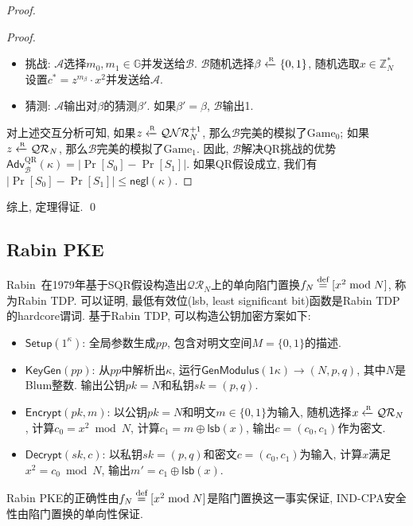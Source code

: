 \begin{proof}
\begin{proof}
\begin{itemize}
	\item 挑战: $\mathcal{A}$选择$m_0, m_1 \in \mathbb{G}$并发送给$\mathcal{B}$.  
		$\mathcal{B}$随机选择$\beta \xleftarrow{\textup{\tiny R}} \{0,1\}$, 随机选取$x \in \mathbb{Z}_N^*$
		设置$c^* = z^{m_\beta} \cdot x^2$并发送给$\mathcal{A}$.   

	\item 猜测: $\mathcal{A}$输出对$\beta$的猜测$\beta'$. 如果$\beta' = \beta$, $\mathcal{B}$输出1. 
\end{itemize} 
对上述交互分析可知, 如果$z \xleftarrow{\textup{\tiny R}} \mathcal{QNR}_N^{+1}$, 那么$\mathcal{B}$完美的模拟了$\text{Game}_0$; 
如果$z \xleftarrow{\textup{\tiny R}} \mathcal{QR}_N$, 那么$\mathcal{B}$完美的模拟了$\text{Game}_1$. 
因此, $\mathcal{B}$解决QR挑战的优势$\mathsf{Adv}_\mathcal{B}^\text{QR}(\kappa) = |\Pr[S_0]-\Pr[S_1]|$. 
如果QR假设成立, 我们有$|\Pr[S_0]-\Pr[S_1]| \leq \mathsf{negl}(\kappa)$. 
\end{proof}
综上, 定理得证. \qed
\end{proof}

\subsection{Rabin PKE}
Rabin~\cite{Rabin-TechReport-1979}在1979年基于SQR假设构造出$\mathcal{QR}_N$上的单向陷门置换$f_N \stackrel{\textup{def}}{=} [x^2 \bmod N]$, 
称为Rabin TDP. 可以证明, 最低有效位(lsb, least significant bit)函数是Rabin TDP的hardcore谓词. 
基于Rabin TDP, 可以构造公钥加密方案如下: 
\begin{definition}
\begin{itemize}
\item $\mathsf{Setup}(1^\kappa)$: 全局参数生成$pp$, 包含对明文空间$M = \{0,1\}$的描述. 

\item $\mathsf{KeyGen}(pp)$: 从$pp$中解析出$\kappa$, 运行$\mathsf{GenModulus}(1\kappa) \rightarrow (N, p, q)$, 
	其中$N$是Blum整数. 输出公钥$pk = N$和私钥$sk = (p, q)$. 

\item $\mathsf{Encrypt}(pk, m)$: 以公钥$pk = N$和明文$m \in \{0,1\}$为输入, 随机选择$x \xleftarrow{\textup{\tiny R}} \mathcal{QR}_N$, 
	计算$c_0 = x^2 \bmod N$, 计算$c_1 = m \oplus \mathsf{lsb}(x)$, 输出$c = (c_0, c_1)$作为密文. 

\item $\mathsf{Decrypt}(sk, c)$: 以私钥$sk = (p, q)$和密文$c = (c_0, c_1)$为输入, 
	计算$x$满足$x^2 = c_0 \bmod N$, 输出$m' = c_1 \oplus \mathsf{lsb}(x)$.
\end{itemize}
\end{definition}

Rabin PKE的正确性由$f_N \stackrel{\textup{def}}{=} [x^2 \bmod N]$是陷门置换这一事实保证, IND-CPA安全性由陷门置换的单向性保证. 